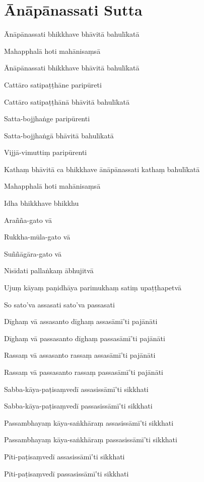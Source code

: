 \section{Ānāpānassati Sutta}


\begin{leader}
\end{leader}

Ānāpānassati bhikkhave bhāvitā bahulīkatā

Mahapphalā hoti mahānisaṃsā

Ānāpānassati bhikkhave bhāvitā bahulīkatā

Cattāro satipaṭṭhāne paripūreti

Cattāro satipaṭṭhānā bhāvitā bahulīkatā

Satta-bojjhaṅge paripūrenti

Satta-bojjhaṅgā bhāvitā bahulīkatā

Vijjā-vimuttiṃ paripūrenti

Kathaṃ bhāvitā ca bhikkhave ānāpānassati kathaṃ bahulīkatā

Mahapphalā hoti mahānisaṃsā

Idha bhikkhave bhikkhu

Arañña-gato vā

Rukkha-mūla-gato vā

Suññāgāra-gato vā

Nisīdati pallaṅkaṃ ābhujitvā

Ujuṃ kāyaṃ paṇidhāya parimukhaṃ satiṃ upaṭṭhapetvā

So sato'va assasati sato'va passasati

Dīghaṃ vā assasanto dīghaṃ assasāmī'ti pajānāti

Dīghaṃ vā passasanto dīghaṃ passasāmī'ti pajānāti

Rassaṃ vā assasanto rassaṃ assasāmī'ti pajānāti

Rassaṃ vā passasanto rassaṃ passasāmī'ti pajānāti

Sabba-kāya-paṭisaṃvedī assasissāmī'ti sikkhati

Sabba-kāya-paṭisaṃvedī passasissāmī'ti sikkhati

Passambhayaṃ kāya-saṅkhāraṃ assasissāmī'ti sikkhati

Passambhayaṃ kāya-saṅkhāraṃ passasissāmī'ti sikkhati

Pīti-paṭisaṃvedī assasissāmī'ti sikkhati

Pīti-paṭisaṃvedī passasissāmī'ti sikkhati

